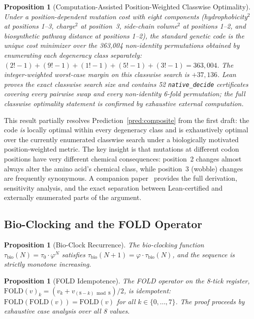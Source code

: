 \documentclass[11pt,a4paper]{article}
\newtheorem{proposition}[theorem]{Proposition}
\newcommand{\ph}{\varphi}
\newcommand{\tick}{\tau_0}
\newcommand{\tbio}{\tau_{\mathrm{bio}}}
\begin{document}
\begin{proposition}[Computation-Assisted Position-Weighted Classwise Optimality]
\label{thm:global-opt}
Under a position-dependent mutation cost with eight components (hydrophobicity$^2$ at positions 1--3, charge$^2$ at position~3, side-chain volume$^2$ at positions 1--2, and biosynthetic pathway distance at positions 1--2), the standard genetic code is the unique cost minimizer over the 363,004 non-identity permutations obtained by enumerating each degeneracy class separately: $(2!{-}1) + (9!{-}1) + (1!{-}1) + (5!{-}1) + (3!{-}1) = 363{,}004$. The integer-weighted worst-case margin on this classwise search is $+37{,}136$. Lean proves the exact classwise search size and contains 52 \texttt{native\_decide} certificates covering every pairwise swap and every non-identity 6-fold permutation; the full classwise optimality statement is confirmed by exhaustive external computation.
\end{proposition}

This result partially resolves Prediction~\ref{pred:composite} from the first draft: the code \emph{is} locally optimal within every degeneracy class and is exhaustively optimal over the currently enumerated classwise search under a biologically motivated position-weighted metric. The key insight is that mutations at different codon positions have very different chemical consequences: position~2 changes almost always alter the amino acid's chemical class, while position~3 (wobble) changes are frequently synonymous. A companion paper~\cite{Washburn2026b} provides the full derivation, sensitivity analysis, and the exact separation between Lean-certified and externally enumerated parts of the argument.

\subsection{Bio-Clocking and the FOLD Operator}

\begin{proposition}[Bio-Clock Recurrence]
\label{prop:bioclock}
The bio-clocking function $\tbio(N) = \tick \cdot \ph^N$ satisfies $\tbio(N+1) = \ph \cdot \tbio(N)$, and the sequence is strictly monotone increasing.
\end{proposition}

\begin{proposition}[FOLD Idempotence]
\label{prop:fold}
The FOLD operator on the 8-tick register, $\mathrm{FOLD}(v)_k = (v_k + v_{(8-k) \bmod 8})/2$, is idempotent: $\mathrm{FOLD}(\mathrm{FOLD}(v)) = \mathrm{FOLD}(v)$ for all $k \in \{0,\ldots,7\}$. The proof proceeds by exhaustive case analysis over all 8 values.
\end{proposition}
\end{document}
